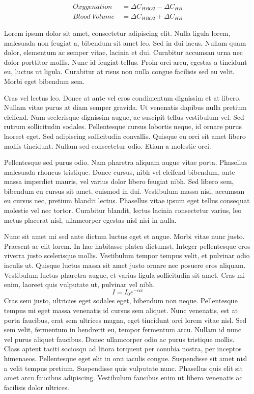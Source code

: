 \begin{align}
  \label{eq:o2bloodvolume}
  Oxygenation\ &= \Delta C_{HBO2} - \Delta C_{HB} \nonumber \\
  Blood\ Volume\ &= \Delta C_{HBO2} + \Delta C_{HB} 
\end{align}

Lorem ipsum dolor sit amet, consectetur adipiscing elit. Nulla ligula lorem, malesuada non feugiat a, bibendum sit amet leo. Sed in dui lacus. Nullam quam dolor, elementum ac semper vitae, lacinia et dui. Curabitur accumsan urna nec dolor porttitor mollis. Nunc id feugiat tellus. Proin orci arcu, egestas a tincidunt eu, luctus ut ligula. Curabitur at risus non nulla congue facilisis sed eu velit. Morbi eget bibendum sem.

Cras vel lectus leo. Donec at ante vel eros condimentum dignissim et at libero. Nullam vitae purus at diam semper gravida. Ut venenatis dapibus nulla pretium eleifend. Nam scelerisque dignissim augue, ac suscipit tellus vestibulum vel. Sed rutrum sollicitudin sodales. Pellentesque cursus lobortis neque, id ornare purus laoreet eget. Sed adipiscing sollicitudin convallis. Quisque eu orci sit amet libero mollis tincidunt. Nullam sed consectetur odio. Etiam a molestie orci.

Pellentesque sed purus odio. Nam pharetra aliquam augue vitae porta. Phasellus malesuada rhoncus tristique. Donec cursus, nibh vel eleifend bibendum, ante massa imperdiet mauris, vel varius dolor libero feugiat nibh. Sed libero sem, bibendum eu cursus sit amet, euismod in dui. Vestibulum massa nisl, accumsan eu cursus nec, pretium blandit lectus. Phasellus vitae ipsum eget tellus consequat molestie vel nec tortor. Curabitur blandit, lectus lacinia consectetur varius, leo metus placerat nisl, ullamcorper egestas nisl nisi in nulla.

Nunc sit amet mi sed ante dictum luctus eget et augue. Morbi vitae nunc justo. Praesent ac elit lorem. In hac habitasse platea dictumst. Integer pellentesque eros viverra justo scelerisque mollis. Vestibulum tempor tempus velit, et pulvinar odio iaculis ut. Quisque luctus massa sit amet justo ornare nec posuere eros aliquam. Vestibulum luctus pharetra augue, et varius ligula sollicitudin sit amet. Cras mi enim, laoreet quis vulputate ut, pulvinar vel nibh.
\begin{equation}
  I = I_0 e^{-\alpha x} \label{eq:beerlambert}
\end{equation}
Cras sem justo, ultricies eget sodales eget, bibendum non neque. Pellentesque tempus mi eget massa venenatis id cursus sem aliquet. Nunc venenatis, est at porta faucibus, erat sem ultrices magna, eget tincidunt orci lorem vitae nisl. Sed sem velit, fermentum in hendrerit eu, tempor fermentum arcu. Nullam id nunc vel purus aliquet faucibus. Donec ullamcorper odio ac purus tristique mollis. Class aptent taciti sociosqu ad litora torquent per conubia nostra, per inceptos himenaeos. Pellentesque eget elit in orci iaculis congue. Suspendisse sit amet nisl a velit tempus pretium. Suspendisse quis vulputate nunc. Phasellus quis elit sit amet arcu faucibus adipiscing. Vestibulum faucibus enim ut libero venenatis ac facilisis dolor ultrices.


